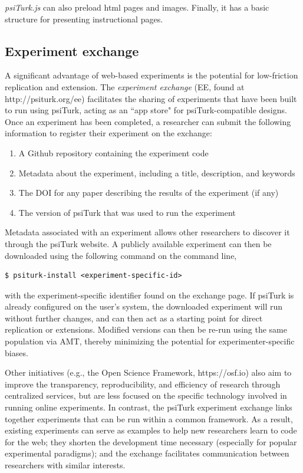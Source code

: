 \documentclass[twocolumn]{svjour3}          %
\begin{document}
\emph{psiTurk.js} can also preload html pages and images.
Finally, it has a basic structure for presenting instructional pages.

\subsection{Experiment exchange}

A significant advantage of web-based experiments is the potential for low-friction replication and extension. 
The \emph{experiment exchange} (EE, found at http://psiturk.org/ee) facilitates the sharing of experiments that have been built to run using psiTurk, acting as an ``app store" for psiTurk-compatible designs.
Once an experiment has been completed, a researcher can submit the following information to register their experiment on the exchange:

\begin{enumerate}
\item A Github repository containing the experiment code
\item Metadata about the experiment, including a title, description, and keywords
\item The DOI for any paper describing the results of the experiment (if any)
\item The version of psiTurk that was used to run the experiment
\end{enumerate}


Metadata associated with an experiment allows other researchers to discover it through the psiTurk website.
A publicly available experiment can then be downloaded using the following command on the command line,

\begin{lstlisting}
$ psiturk-install <experiment-specific-id>
\end{lstlisting}

\noindent with the experiment-specific identifier found on the exchange page.
If psiTurk is already configured on the user's system, the downloaded experiment will run without further changes, and can then act as a starting point for direct replication or extensions.
Modified versions can then be re-run using the same population via AMT, thereby minimizing the potential for experimenter-specific biases.

Other initiatives (e.g., the Open Science Framework, https://osf.io) also aim to improve the transparency, reproducibility, and efficiency of research through centralized services, but are less focused on the specific technology involved in running online experiments.
In contrast, the psiTurk experiment exchange links together experiments that can be run within a common framework.
As a result, existing experiments can serve as examples to help new researchers learn to code for the web; they shorten the development time necessary (especially for popular experimental paradigms); and the exchange facilitates communication between researchers with similar interests.
\end{document}
